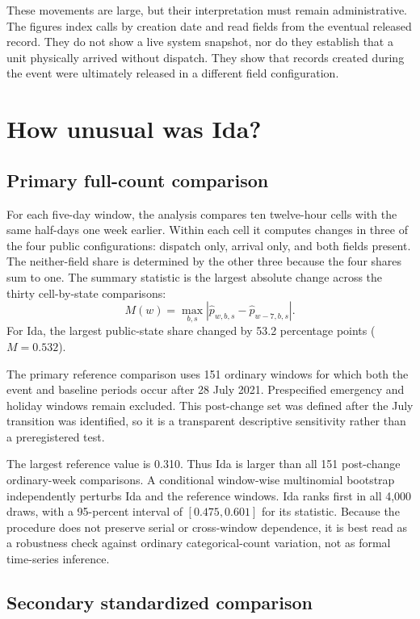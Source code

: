 \documentclass[11pt]{article}
\begin{document}
These movements are large, but their interpretation must remain administrative. The figures index calls by creation date and read fields from the eventual released record. They do not show a live system snapshot, nor do they establish that a unit physically arrived without dispatch. They show that records created during the event were ultimately released in a different field configuration.

\section{How unusual was Ida?}

\subsection{Primary full-count comparison}

For each five-day window, the analysis compares ten twelve-hour cells with the same half-days one week earlier. Within each cell it computes changes in three of the four public configurations: dispatch only, arrival only, and both fields present. The neither-field share is determined by the other three because the four shares sum to one. The summary statistic is the largest absolute change across the thirty cell-by-state comparisons:
\begin{equation}
M(w)=\max_{b,s}\left|\widehat p_{w,b,s}-\widehat p_{w-7,b,s}\right|.
\end{equation}
For Ida, the largest public-state share changed by 53.2 percentage points ($M=0.532$).

The primary reference comparison uses 151 ordinary windows for which both the event and baseline periods occur after 28 July 2021. Prespecified emergency and holiday windows remain excluded. This post-change set was defined after the July transition was identified, so it is a transparent descriptive sensitivity rather than a preregistered test.

The largest reference value is 0.310. Thus Ida is larger than all 151 post-change ordinary-week comparisons. A conditional window-wise multinomial bootstrap independently perturbs Ida and the reference windows. Ida ranks first in all 4,000 draws, with a 95-percent interval of $[0.475,0.601]$ for its statistic. Because the procedure does not preserve serial or cross-window dependence, it is best read as a robustness check against ordinary categorical-count variation, not as formal time-series inference.

\subsection{Secondary standardized comparison}
\end{document}
